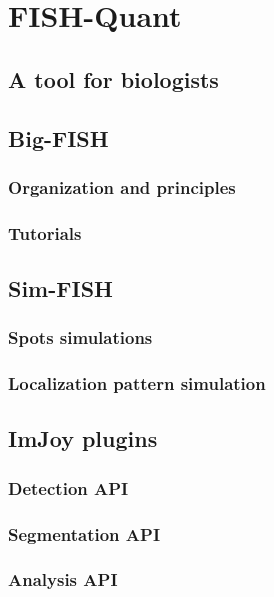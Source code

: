 
\graphicspath{{./figures/chapter_1/}}


\chapter{FISH-Quant} \label{chap:chapter_1}
\minitoc
\newpage


\section{A tool for biologists}


\section{Big-FISH}


\subsection{Organization and principles}

\subsection{Tutorials}


\section{Sim-FISH}


\subsection{Spots simulations}

\subsection{Localization pattern simulation}


\section{ImJoy plugins}


\subsection{Detection API}

\subsection{Segmentation API}

\subsection{Analysis API}
